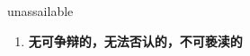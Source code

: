 
\begin{frame}
{\huge unassailable}
\begin{center}
\begin{enumerate}\Large
  \item \textbf{无可争辩的，无法否认的，不可亵渎的}
\end{enumerate}
\end{center}
\end{frame}
